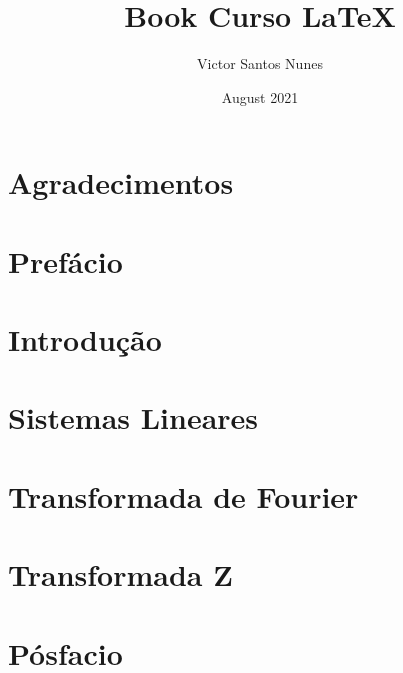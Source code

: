 \documentclass[a4paper, 12pt, openany]{book}
\title{Book Curso \LaTeX}
\author{Victor Santos Nunes}
\date{August 2021}
\begin{document}
\frontmatter
\maketitle
\listoffigures
\listoftables
\tableofcontents
\chapter{Agradecimentos}
\chapter{Prefácio}

\mainmatter
\chapter{Introdução}

\chapter{Sistemas Lineares}


\appendix
\chapter{Transformada de Fourier}
\chapter{Transformada Z}

\backmatter
\chapter{Pósfacio}
\end{document}
